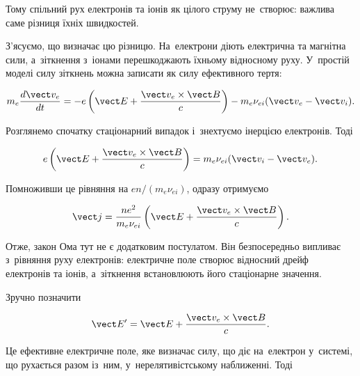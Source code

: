 Тому спільний рух електронів та іонів як цілого струму не~створює: важлива саме різниця
їхніх швидкостей.

З'ясуємо, що визначає цю різницю. На~електрони діють електрична та магнітна сили,
а~зіткнення з~іонами перешкоджають їхньому відносному руху. У~простій моделі силу зіткнень
можна записати як силу ефективного тертя:

\begin{equation}\label{eq:electron-momentum-ohm}
	m_e\frac{d\vect v_e}{dt}
	=-e\left(\vect E+\frac{\vect v_e\times\vect B}{c}\right)
	-m_e\nu_{ei}(\vect v_e-\vect v_i).
\end{equation}

Розглянемо спочатку стаціонарний випадок і~знехтуємо інерцією електронів. Тоді

\begin{equation*}
	e\left(\vect E+\frac{\vect v_e\times\vect B}{c}\right)
	=m_e\nu_{ei}(\vect v_i-\vect v_e).
\end{equation*}

Помноживши це рівняння на $en/(m_e\nu_{ei})$, одразу отримуємо

\begin{equation*}
	\vect j=
	\frac{ne^2}{m_e\nu_{ei}}
	\left(\vect E+\frac{\vect v_e\times\vect B}{c}\right).
\end{equation*}

Отже, закон Ома тут не є додатковим постулатом. Він безпосередньо випливає з~рівняння руху
електронів: електричне поле створює відносний дрейф електронів та іонів, а~зіткнення
встановлюють його стаціонарне значення.

Зручно позначити

\begin{equation*}
	\vect E'=\vect E+\frac{\vect v_e\times\vect B}{c}.
\end{equation*}

Це ефективне електричне поле, яке визначає силу, що діє на~електрон у~системі, що
рухається разом із~ним, у~нерелятивістському наближенні. Тоді

